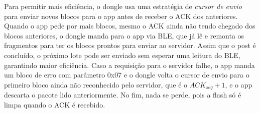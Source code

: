 \documentclass[
	12pt,
	article,			%
	oneside,
	a4paper,
	english,
	brazil				%
	]{abntex2}
\begin{document}
Para permitir mais eficiência, o dongle usa uma estratégia de \textit{cursor de envio} para enviar novos blocos para o app antes de receber o ACK dos anteriores.
Quando o app pede por mais blocos, mesmo o ACK ainda não tendo chegado dos blocos anteriores, o dongle manda para o app via BLE, que já lê e remonta os fragmentos
para ter os blocos prontos para enviar ao servidor. Assim que o post é concluído, o próximo lote pode ser enviado sem esperar uma leitura do BLE, garantindo maior eficiência.
Caso a requisição para o servidor falhe, o app manda um bloco de erro com parâmetro 0x07 e o dongle volta o cursor de envio para o primeiro bloco ainda não reconhecido pelo servidor, que é o $ACK_{seq} + 1$,
e o app descarta o pacote lido anteriormente. No fim, nada se perde, pois a flash só é limpa quando o ACK é recebido.
\end{document}
